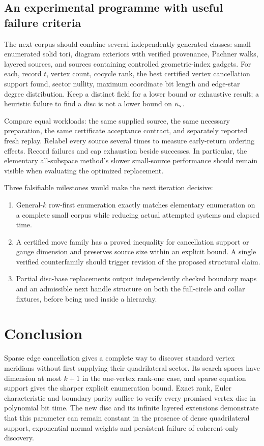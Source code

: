 \subsection{An experimental programme with useful failure criteria}

The next corpus should combine several independently generated classes:
small enumerated solid tori, diagram exteriors with verified provenance,
Pachner walks, layered sources, and sources containing controlled
geometric-index gadgets. For each, record $t$, vertex count, cocycle rank,
the best certified vertex cancellation support found, sector nullity,
maximum coordinate bit length and edge-star degree distribution.
Keep a distinct field for a lower bound or exhaustive result; a heuristic
failure to find a disc is not a lower bound on $\kappa_{\mathrm{v}}$.

Compare equal workloads: the same supplied source, the same necessary
preparation, the same certificate acceptance contract, and separately
reported fresh replay. Relabel every source several times to measure
early-return ordering effects. Record failures and cap exhaustion beside
successes. In particular, the elementary all-subspace method's slower
small-source performance should remain visible when evaluating the
optimized replacement.

Three falsifiable milestones would make the next iteration decisive:
\begin{enumerate}
\item General-$k$ row-first enumeration exactly matches elementary
enumeration on a complete small corpus while reducing actual attempted
systems and elapsed time.
\item A certified move family has a proved inequality for cancellation
support or gauge dimension and preserves source size within an explicit
bound. A single verified counterfamily should trigger revision of the
proposed structural claim.
\item Partial disc-base replacements output independently checked
boundary maps and an admissible next handle structure on both the
full-circle and collar fixtures, before being used inside a hierarchy.
\end{enumerate}

\section{Conclusion}

Sparse edge cancellation gives a complete way to discover standard vertex
meridians without first supplying their quadrilateral sector. Its search
spaces have dimension at most $k+1$ in the one-vertex rank-one case, and
sparse equation support gives the sharper explicit enumeration bound.
Exact rank, Euler characteristic and boundary parity suffice to verify
every promised vertex disc in polynomial bit time. The new disc and its
infinite layered extensions demonstrate that this parameter can remain
constant in the presence of dense quadrilateral support, exponential
normal weights and persistent failure of coherent-only discovery.

